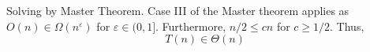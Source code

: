 \documentclass[12pt,twoside]{article}
\begin{document}
\begin{problems}
\begin{problemparts}
Solving by Master Theorem. Case III of the Master theorem applies as $ O(n) 
\in \Omega(n^{\varepsilon}) $ for $\varepsilon \in (0, 1]$. Furthermore,
$n / 2 \leq c n$ for $c \geq 1/2$. Thus,
$$T(n) \in \Theta(n) $$

\end{problemparts}

\end{problems}
\end{document}
